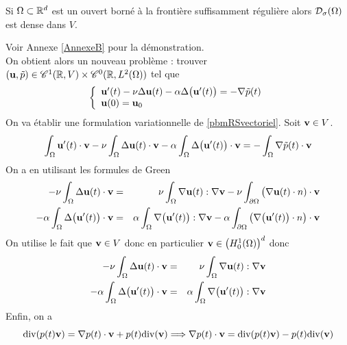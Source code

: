 \begin{theoreme}\label{thm_densite}
    Si $\Omega \subset \mathbb{R}^d$ est un ouvert borné à la frontière suffisamment régulière alors $\mathcal{D}_{\sigma}(\Omega)$ est dense dans $V$.
\end{theoreme}

Voir Annexe \ref{AnnexeB} pour la démonstration.
\\
On obtient alors un nouveau problème : trouver $(\bm{\mathrm{u}}, \tilde{p}) \in \mathscr{C}^1(\mathbb{R}, V) \times \mathscr{C}^0(\mathbb{R}, L^2(\Omega))$ tel que
\begin{equation}\label{pbmRSvectoriel}
    \left\{\begin{array}{l}
        \bm{\mathrm{u}}'(t) - \nu\Delta \bm{\mathrm{u}}(t) - \alpha\Delta \big(\bm{\mathrm{u}}'(t)\big) = -\nabla \tilde{p}(t) \\
         \bm{\mathrm{u}}(0) = \bm{\mathrm{u}}_0 
    \end{array}\right.
\end{equation}
On va établir une formulation variationnelle de \eqref{pbmRSvectoriel}. Soit $\bm{\mathrm{v}} \in V$.
\begin{eqnarray*}
    \int_{\Omega}\bm{\mathrm{u}}'(t) \cdot \bm{\mathrm{v}} - \nu \int_{\Omega} \Delta \bm{\mathrm{u}}(t) \cdot \bm{\mathrm{v}} - \alpha \int_{\Omega} \Delta\big(\bm{\mathrm{u}}'(t)\big) \cdot \bm{\mathrm{v}} = -\int_{\Omega} \nabla \tilde{p}(t) \cdot \bm{\mathrm{v}}
\end{eqnarray*}
On a en utilisant les formules de Green
\begin{eqnarray*}
    - \nu \int_{\Omega} \Delta \bm{\mathrm{u}}(t) \cdot \bm{\mathrm{v}} &=& \nu \int_{\Omega} \nabla \bm{\mathrm{u}}(t) : \nabla \bm{\mathrm{v}} -\nu \int_{\partial\Omega}\big(\nabla \bm{\mathrm{u}}(t) \cdot n) \cdot \bm{\mathrm{v}} \\
    - \alpha \int_{\Omega} \Delta\big(\bm{\mathrm{u}}'(t)\big) \cdot \bm{\mathrm{v}} &=& \alpha \int_{\Omega} \nabla \big(\bm{\mathrm{u}}'(t)\big) : \nabla \bm{\mathrm{v}} - \alpha \int_{\partial \Omega} \big(\nabla \big(\bm{\mathrm{u}}'(t)\big)\cdot n \big) \cdot \bm{\mathrm{v}}
\end{eqnarray*}
On utilise le fait que $\bm{\mathrm{v}} \in V$ donc en particulier $\bm{\mathrm{v}} \in \big(H^1_0(\Omega)\big)^d$ donc 
\begin{eqnarray*}
    - \nu \int_{\Omega} \Delta \bm{\mathrm{u}}(t) \cdot \bm{\mathrm{v}} &=& \nu \int_{\Omega} \nabla \bm{\mathrm{u}}(t) : \nabla \bm{\mathrm{v}} \\
    - \alpha \int_{\Omega} \Delta\big(\bm{\mathrm{u}}'(t)\big) \cdot \bm{\mathrm{v}} &=& \alpha \int_{\Omega} \nabla \big(\bm{\mathrm{u}}'(t)\big) : \nabla \bm{\mathrm{v}}
\end{eqnarray*}
Enfin, on a 
\begin{equation*}
    \mathrm{div}(p(t)\bm{\mathrm{v}}) = \nabla p(t) \cdot \bm{\mathrm{v}} + p(t)\mathrm{div}(\bm{\mathrm{v}}) \Longrightarrow \nabla p(t) \cdot \bm{\mathrm{v}} = \mathrm{div}(p(t)\bm{\mathrm{v}}) - p(t)\mathrm{div}(\bm{\mathrm{v}})
\end{equation*}
